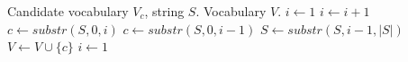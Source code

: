 \begin{algorithmic}[1]
\Require Candidate vocabulary $V_c$, string $S$.
\Ensure Vocabulary $V$.
\State $i \gets 1$
  \State $i \gets i + 1$
  \State $c \gets substr(S, 0, i)$
    \State $c \gets substr(S, 0, i - 1)$
    \State $S \gets substr(S, i - 1, |S|)$
    \State $V \gets V \cup \{ c \}$
    \State $i \gets 1$
  \EndIf
\EndWhile
\end{algorithmic}

